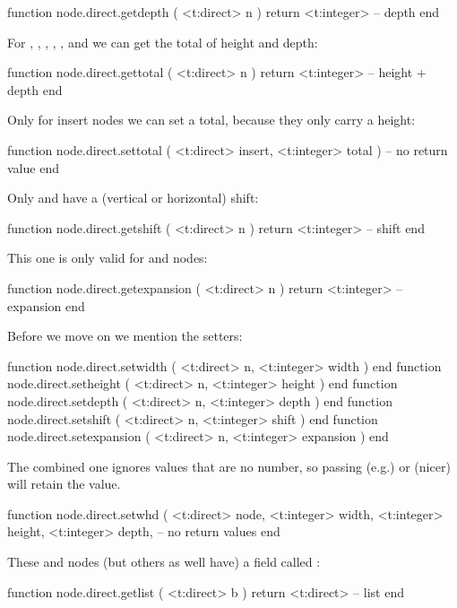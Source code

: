\starttyping[option=LUA]
function node.direct.getdepth ( <t:direct> n )
    return <t:integer> -- depth
end
\stoptyping

For , , , , ,
 and  we can get the total of height and depth:

\starttyping[option=LUA]
function node.direct.gettotal ( <t:direct> n )
    return <t:integer> -- height + depth
end
\stoptyping

Only for insert nodes we can set a total, because they only carry a height:

\starttyping[option=LUA]
function node.direct.settotal (
    <t:direct>  insert,
    <t:integer> total
)
    -- no return value
end
\stoptyping

Only  and  have a (vertical or horizontal) shift:

\starttyping[option=LUA]
function node.direct.getshift ( <t:direct> n )
    return <t:integer> -- shift
end
\stoptyping

This one is only valid for  and  nodes:

\starttyping[option=LUA]
function node.direct.getexpansion ( <t:direct> n )
    return <t:integer> -- expansion
end
\stoptyping

Before we move on we mention the setters:

\starttyping[option=LUA]
function node.direct.setwidth     ( <t:direct> n, <t:integer> width     ) end
function node.direct.setheight    ( <t:direct> n, <t:integer> height    ) end
function node.direct.setdepth     ( <t:direct> n, <t:integer> depth     ) end
function node.direct.setshift     ( <t:direct> n, <t:integer> shift     ) end
function node.direct.setexpansion ( <t:direct> n, <t:integer> expansion ) end
\stoptyping

The combined one ignores values that are no number, so passing (e.g.) 
or (nicer)  will retain the value.

\starttyping[option=LUA]
function node.direct.setwhd (
    <t:direct>  node,
    <t:integer> width,
    <t:integer> height,
    <t:integer> depth,
    -- no return values
end
\stoptyping

These  and  nodes (but others as well have) a field
called :

\starttyping[option=LUA]
function node.direct.getlist ( <t:direct> b )
    return <t:direct> -- list
end

